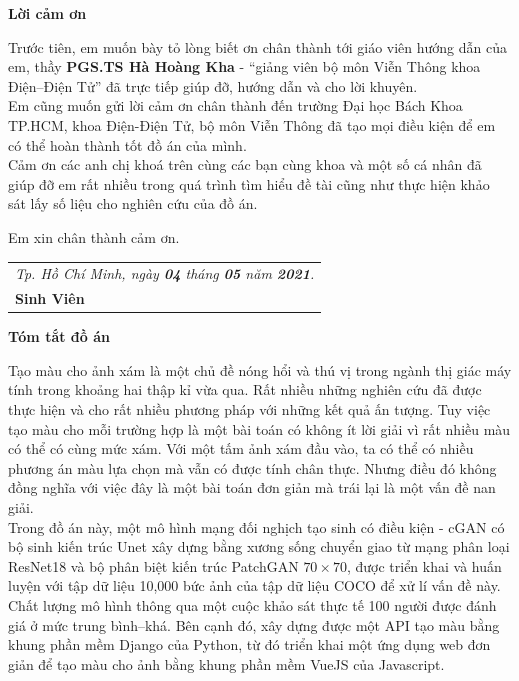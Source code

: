 \documentclass[a4paper, 12pt]{article}
\begin{document}
\newpage

\begin{center}
\huge
\textbf{Lời cảm ơn}
\end{center}

\indent
Trước tiên, em muốn bày tỏ lòng biết ơn chân thành tới giáo viên hướng dẫn của em, thầy \textbf{PGS.TS Hà Hoàng Kha} - ``giảng viên bộ môn Viễn Thông khoa Điện--Điện Tử'' đã trực tiếp giúp đỡ, hướng dẫn và cho lời khuyên.\vspace{5pt}\\
Em cũng muốn gửi lời cảm ơn chân thành đến trường Đại học Bách Khoa TP.HCM, khoa Điện-Điện Tử, bộ môn Viễn Thông đã tạo mọi điều kiện để em có thể hoàn thành tốt đồ án của mình.\vspace{5pt}\\
Cảm ơn các anh chị khoá trên cùng các bạn cùng khoa và một số cá nhân đã giúp đỡ em rất nhiều trong quá trình tìm hiểu đề tài cũng như thực hiện khảo sát lấy số liệu cho nghiên cứu của đồ án.\vspace{5pt}

Em xin chân thành cảm ơn.\vspace{20pt}\\

\hfill
\begin{tabular}{l@{}}
\textit{Tp. Hồ Chí Minh, ngày \textbf{04} tháng \textbf{05} năm \textbf{2021}.}\vspace{10pt}\\
\hspace{3cm}\textbf{Sinh Viên}
\end{tabular}

\newpage

\begin{center}
\huge
\textbf{Tóm tắt đồ án}
\end{center}

\indent
Tạo màu cho ảnh xám là một chủ đề nóng hổi và thú vị trong ngành thị giác máy tính trong khoảng hai thập kỉ vừa qua. Rất nhiều những nghiên cứu đã được thực hiện và cho rất nhiều phương pháp với những kết quả ấn tượng. Tuy việc tạo màu cho mỗi trường hợp là một bài toán có không ít lời giải vì rất nhiều màu có thể có cùng mức xám. Với một tấm ảnh xám đầu vào, ta có thể có nhiều phương án màu lựa chọn mà vẫn có được tính chân thực. Nhưng điều đó không đồng nghĩa với việc đây là một bài toán đơn giản mà trái lại là một vấn đề nan giải.\vspace{5pt}\\
Trong đồ án này, một mô hình mạng đối nghịch tạo sinh có điều kiện - cGAN có bộ sinh kiến trúc Unet xây dựng bằng xương sống chuyển giao từ mạng phân loại ResNet18 và bộ phân biệt kiến trúc PatchGAN $70\times 70$, được triển khai và huấn luyện với tập dữ liệu 10,000 bức ảnh của tập dữ liệu COCO để xử lí vấn đề này. Chất lượng mô hình thông qua một cuộc khảo sát thực tế 100 người được đánh giá ở mức trung bình--khá.
Bên cạnh đó, xây dựng được một API tạo màu bằng khung phần mềm Django của Python, từ đó triển khai một ứng dụng web đơn giản để tạo màu cho ảnh bằng khung phần mềm VueJS của Javascript.
\end{document}
